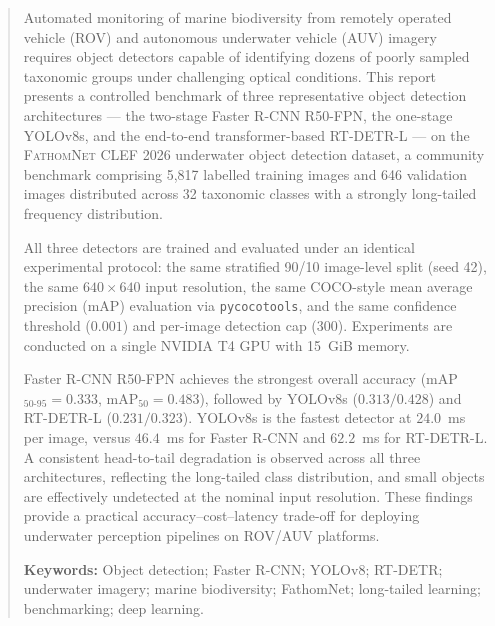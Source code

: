 \documentclass[11pt,a4paper]{article}
\newcommand{\dataset}{\textsc{FathomNet CLEF 2026}}
\begin{document}
\begin{abstract}
\noindent Automated monitoring of marine biodiversity from remotely operated vehicle (ROV) and autonomous underwater vehicle (AUV) imagery requires object detectors capable of identifying dozens of poorly sampled taxonomic groups under challenging optical conditions. This report presents a controlled benchmark of three representative object detection architectures --- the two-stage Faster R-CNN R50-FPN, the one-stage YOLOv8s, and the end-to-end transformer-based RT-DETR-L --- on the \dataset{} underwater object detection dataset, a community benchmark comprising 5,817 labelled training images and 646 validation images distributed across 32 taxonomic classes with a strongly long-tailed frequency distribution.

All three detectors are trained and evaluated under an identical experimental protocol: the same stratified 90/10 image-level split (seed 42), the same $640\times640$ input resolution, the same COCO-style mean average precision (mAP) evaluation via \texttt{pycocotools}, and the same confidence threshold ($0.001$) and per-image detection cap ($300$). Experiments are conducted on a single NVIDIA T4 GPU with 15~GiB memory.

Faster R-CNN R50-FPN achieves the strongest overall accuracy (mAP$_{50\text{-}95}=0.333$, mAP$_{50}=0.483$), followed by YOLOv8s ($0.313/0.428$) and RT-DETR-L ($0.231/0.323$). YOLOv8s is the fastest detector at $24.0$~ms per image, versus $46.4$~ms for Faster R-CNN and $62.2$~ms for RT-DETR-L. A consistent head-to-tail degradation is observed across all three architectures, reflecting the long-tailed class distribution, and small objects are effectively undetected at the nominal input resolution. These findings provide a practical accuracy--cost--latency trade-off for deploying underwater perception pipelines on ROV/AUV platforms.

\medskip
\noindent\textbf{Keywords:} Object detection; Faster R-CNN; YOLOv8; RT-DETR; underwater imagery; marine biodiversity; FathomNet; long-tailed learning; benchmarking; deep learning.
\end{abstract}

\tableofcontents
\newpage
\end{document}
